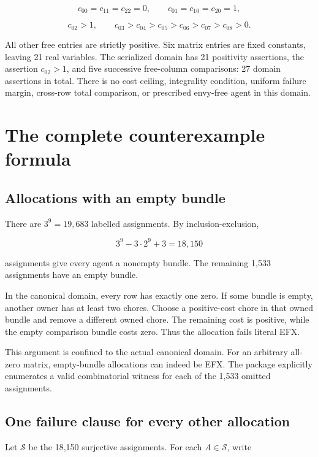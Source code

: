 \documentclass[
  11pt,
]{article}
\newcounter{none} %
\begin{document}
\[
c_{00}=c_{11}=c_{22}=0,\qquad c_{01}=c_{10}=c_{20}=1,
\]

\[
c_{02}>1,\qquad c_{03}>c_{04}>c_{05}>c_{06}>c_{07}>c_{08}>0.
\]

All other free entries are strictly positive. Six matrix entries are
fixed constants, leaving 21 real variables. The serialized domain has 21
positivity assertions, the assertion \(c_{02}>1\), and five successive
free-column comparisons: 27 domain assertions in total. There is no cost
ceiling, integrality condition, uniform failure margin, cross-row total
comparison, or prescribed envy-free agent in this domain.

\section{The complete counterexample
formula}\label{the-complete-counterexample-formula}

\subsection{Allocations with an empty
bundle}\label{allocations-with-an-empty-bundle}

There are \(3^9=19,683\) labelled assignments. By inclusion-exclusion,

\[
3^9-3\cdot2^9+3=18,150
\]

assignments give every agent a nonempty bundle. The remaining 1,533
assignments have an empty bundle.

In the canonical domain, every row has exactly one zero. If some bundle
is empty, another owner has at least two chores. Choose a positive-cost
chore in that owned bundle and remove a different owned chore. The
remaining cost is positive, while the empty comparison bundle costs
zero. Thus the allocation fails literal EFX.

This argument is confined to the actual canonical domain. For an
arbitrary all-zero matrix, empty-bundle allocations can indeed be EFX.
The package explicitly enumerates a valid combinatorial witness for each
of the 1,533 omitted assignments.

\subsection{One failure clause for every other
allocation}\label{one-failure-clause-for-every-other-allocation}

Let \(\mathcal S\) be the 18,150 surjective assignments. For each
\(A\in\mathcal S\), write
\end{document}
